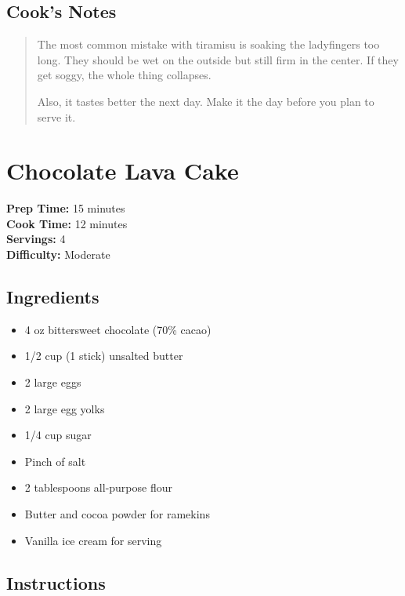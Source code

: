 \documentclass[
    language=english,
    doctype=recipe-book,
    institution=none,
]{../../omnilatex}
\begin{document}
\subsection*{Cook's Notes}
\begin{quote}
The most common mistake with tiramisu is soaking the ladyfingers too long. They should be wet on the outside but still firm in the center. If they get soggy, the whole thing collapses.

Also, it tastes better the next day. Make it the day before you plan to serve it.
\end{quote}

\section*{Chocolate Lava Cake}

\begin{recipebox}
\textbf{Prep Time:} 15 minutes\\
\textbf{Cook Time:} 12 minutes\\
\textbf{Servings:} 4\\
\textbf{Difficulty:} Moderate
\end{recipebox}

\subsection*{Ingredients}

\begin{itemize}
    \item 4 oz bittersweet chocolate (70\% cacao)
    \item 1/2 cup (1 stick) unsalted butter
    \item 2 large eggs
    \item 2 large egg yolks
    \item 1/4 cup sugar
    \item Pinch of salt
    \item 2 tablespoons all-purpose flour
    \item Butter and cocoa powder for ramekins
    \item Vanilla ice cream for serving
\end{itemize}

\subsection*{Instructions}
\end{document}
